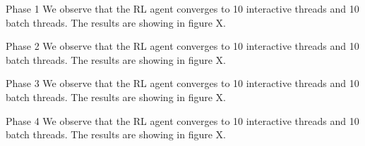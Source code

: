 \label{appendix:e}

Phase 1
We observe that the RL agent converges to 10 interactive threads and 10 batch threads. The results are showing in figure X.

Phase 2
We observe that the RL agent converges to 10 interactive threads and 10 batch threads. The results are showing in figure X.

Phase 3
We observe that the RL agent converges to 10 interactive threads and 10 batch threads. The results are showing in figure X.

Phase 4
We observe that the RL agent converges to 10 interactive threads and 10 batch threads. The results are showing in figure X.